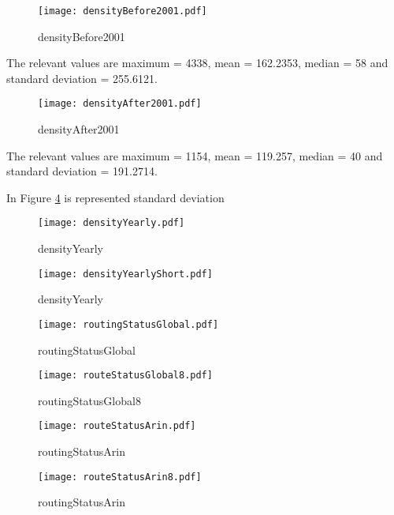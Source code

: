 \documentclass[11pt,a4paper]{scrreprt}
\begin{document}
\begin{figure}[ht!]
\centering
\texttt{[image: densityBefore2001.pdf]}
\caption{densityBefore2001}
\label{fig:densityBefore2001}
\end{figure}

The relevant values are maximum = 4338, mean = 162.2353, median = 58 and standard deviation = 255.6121.


\begin{figure}[ht!]
\centering
\texttt{[image: densityAfter2001.pdf]}
\caption{densityAfter2001}
\label{fig:densityAfter2001}
\end{figure}

The relevant values are maximum = 1154, mean = 119.257, median = 40 and standard deviation = 191.2714.



In Figure \ref{fig:densityYearly} is represented standard deviation

\begin{figure}[ht!]
\centering
\texttt{[image: densityYearly.pdf]}
\caption{densityYearly}
\label{fig:densityYearly}
\end{figure}

\begin{figure}[ht!]
\centering
\texttt{[image: densityYearlyShort.pdf]}
\caption{densityYearly}
\label{fig:densityYearly}
\end{figure}



\begin{figure}[h!]
\centering
\texttt{[image: routingStatusGlobal.pdf]}
\caption{routingStatusGlobal}
\label{fig:routingStatusGlobal}
\end{figure}

\begin{figure}[h!]
\centering
\texttt{[image: routeStatusGlobal8.pdf]}
\caption{routingStatusGlobal8}
\label{fig:routingStatusGlobal8}
\end{figure}

\begin{figure}[h!]
\centering
\texttt{[image: routeStatusArin.pdf]}
\caption{routingStatusArin}
\label{fig:routingStatusArin}
\end{figure}

\begin{figure}[h!]
\centering
\texttt{[image: routeStatusArin8.pdf]}
\caption{routingStatusArin}
\label{fig:routingStatusArin}
\end{figure}
\end{document}
